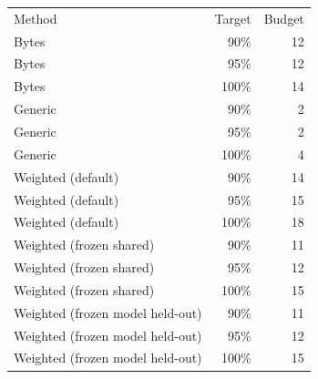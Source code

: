 \begin{tabular}{lrr}
Method & Target & Budget \\
Bytes & 90\% & 12 \\
Bytes & 95\% & 12 \\
Bytes & 100\% & 14 \\
Generic & 90\% & 2 \\
Generic & 95\% & 2 \\
Generic & 100\% & 4 \\
Weighted (default) & 90\% & 14 \\
Weighted (default) & 95\% & 15 \\
Weighted (default) & 100\% & 18 \\
Weighted (frozen shared) & 90\% & 11 \\
Weighted (frozen shared) & 95\% & 12 \\
Weighted (frozen shared) & 100\% & 15 \\
Weighted (frozen model held-out) & 90\% & 11 \\
Weighted (frozen model held-out) & 95\% & 12 \\
Weighted (frozen model held-out) & 100\% & 15 \\
\end{tabular}
